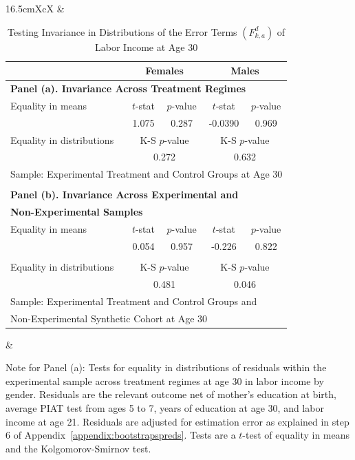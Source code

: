 \begin{table}[H]
\begin{threeparttable}
\caption{Testing Invariance in Distributions of the  Error Terms $\left( F_{k,a}^d \right)$ of Labor Income at Age 30} \label{table:invarianceerrors}
\centering
\footnotesize
\begin{tabularx}{16.5cm}{XcX}
& \begin{tabular}{lcccc} \toprule
& \multicolumn{2}{c}{Females} &   \multicolumn{2}{c}{Males} \\ \midrule
\multicolumn{5}{l}{\textbf{Panel (a). Invariance Across Treatment Regimes}} \\
 Equality in means & $t$-stat & $p$-value & $t$-stat & $p$-value \\
 & 1.075 & 0.287 & -0.0390 &  0.969  \\
Equality in distributions & \multicolumn{2}{c}{K-S $p$-value} &  \multicolumn{2}{c}{K-S $p$-value}  \\
                                      & \multicolumn{2}{c}{0.272} &  \multicolumn{2}{c}{0.632}  \\
\multicolumn{5}{l}{Sample: Experimental Treatment and Control Groups at Age 30} \\ \\
\multicolumn{5}{l}{\textbf{Panel (b). Invariance Across Experimental and }} \\
\multicolumn{5}{l}{\textbf{Non-Experimental Samples}} \\
Equality in means & $t$-stat & $p$-value & $t$-stat & $p$-value \\
 & 0.054  & 0.957 & -0.226 & 0.822   \\ \\
Equality in distributions & \multicolumn{2}{c}{K-S $p$-value} &  \multicolumn{2}{c}{K-S $p$-value}  \\
                                      & \multicolumn{2}{c}{0.481} &  \multicolumn{2}{c}{0.046}  \\
\multicolumn{5}{l}{Sample: Experimental Treatment and Control Groups and} \\
\multicolumn{5}{l}{Non-Experimental Synthetic Cohort at Age 30 } \\ \bottomrule
\end{tabular} &
\end{tabularx}
\begin{tablenotes}
\footnotesize
\item Note for Panel (a): Tests for equality in distributions of residuals within the experimental sample across treatment regimes at age 30 in labor income by gender. Residuals are the relevant outcome net of mother's education at birth, average PIAT test from ages 5 to 7, years of education at age 30, and labor income at age 21. Residuals are adjusted for estimation error as explained in step 6 of Appendix~\ref{appendix:bootstrapspreds}. Tests are a $t$-test of equality in means and the Kolgomorov-Smirnov test.\\

\end{tablenotes}
\end{threeparttable}
\end{table}
